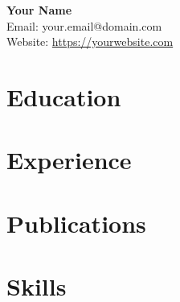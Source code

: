 \documentclass[11pt]{article}
\begin{document}
\begin{center}
    {\LARGE \textbf{Your Name}}\\
    \vspace{0.5em}
    Email: your.email@domain.com \\
    Website: \url{https://yourwebsite.com}
\end{center}

\section*{Education}

\section*{Experience}

\section*{Publications}

\section*{Skills}
\end{document}
